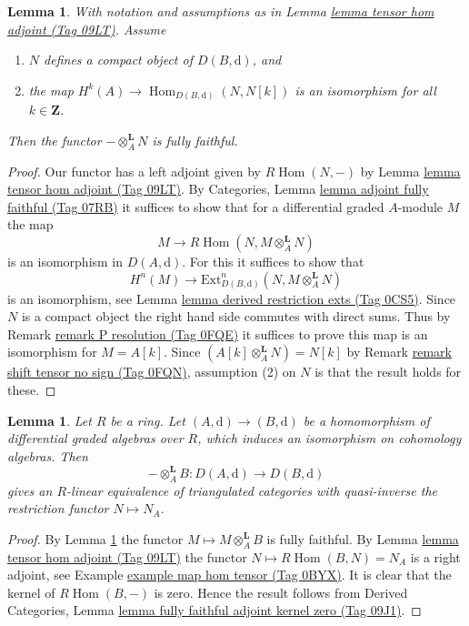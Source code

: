 \documentclass{amsart}
\theoremstyle{plain}
\newtheorem{lemma}[subsection]{Lemma}
\theoremstyle{definition}
\theoremstyle{remark}
\numberwithin{equation}{subsection}
\def\Hom{\mathop{\mathrm{Hom}}\nolimits}
\begin{document}
\begin{lemma}
\label{lemma-tensor-with-compact-fully-faithful}
With notation and assumptions as in Lemma \href{https://stacks.math.columbia.edu/tag/09LT}{lemma tensor hom adjoint (Tag 09LT)}.
Assume
\begin{enumerate}
\item $N$ defines a compact object of $D(B, \text{d})$, and
\item the map $H^k(A) \to \Hom_{D(B, \text{d})}(N, N[k])$ is an
isomorphism for all $k \in \mathbf{Z}$.
\end{enumerate}
Then the functor $-\otimes_A^\mathbf{L} N$ is fully faithful.
\end{lemma}

\begin{proof}
Our functor has a left adjoint given by
$R\Hom(N, -)$ by Lemma \href{https://stacks.math.columbia.edu/tag/09LT}{lemma tensor hom adjoint (Tag 09LT)}.
By Categories, Lemma \href{https://stacks.math.columbia.edu/tag/07RB}{lemma adjoint fully faithful (Tag 07RB)}
it suffices to show that for a differential graded $A$-module $M$
the map
$$
M \longrightarrow R\Hom(N, M \otimes_A^\mathbf{L} N)
$$
is an isomorphism in $D(A, \text{d})$. For this it suffices to show that
$$
H^n(M) \longrightarrow
\text{Ext}^n_{D(B, \text{d})}(N, M \otimes_A^\mathbf{L} N)
$$
is an isomorphism, see Lemma \href{https://stacks.math.columbia.edu/tag/0CS5}{lemma derived restriction exts (Tag 0CS5)}.
Since $N$ is a compact object the right hand side commutes
with direct sums. Thus by Remark \href{https://stacks.math.columbia.edu/tag/0FQE}{remark P resolution (Tag 0FQE)}
it suffices to prove this map is an isomorphism for $M = A[k]$.
Since $(A[k] \otimes_A^\mathbf{L} N) = N[k]$ by
Remark \href{https://stacks.math.columbia.edu/tag/0FQN}{remark shift tensor no sign (Tag 0FQN)},
assumption (2) on $N$ is that the result holds for these.
\end{proof}


\begin{lemma}
\label{lemma-qis-equivalence}
Let $R$ be a ring. Let $(A, \text{d}) \to (B, \text{d})$ be a
homomorphism of differential graded algebras over $R$, which induces
an isomorphism on cohomology algebras. Then
$$
- \otimes_A^\mathbf{L} B : D(A, \text{d}) \to D(B, \text{d})
$$
gives an $R$-linear equivalence of triangulated categories with
quasi-inverse the restriction functor $N \mapsto N_A$.
\end{lemma}

\begin{proof}
By Lemma \ref{lemma-tensor-with-compact-fully-faithful}
the functor $M \longmapsto M \otimes_A^\mathbf{L} B$ is
fully faithful. By Lemma \href{https://stacks.math.columbia.edu/tag/09LT}{lemma tensor hom adjoint (Tag 09LT)}
the functor $N \longmapsto R\Hom(B, N) = N_A$ is a right adjoint, see
Example \href{https://stacks.math.columbia.edu/tag/0BYX}{example map hom tensor (Tag 0BYX)}.
It is clear that the kernel of $R\Hom(B, -)$ is zero.
Hence the result follows from
Derived Categories, Lemma
\href{https://stacks.math.columbia.edu/tag/09J1}{lemma fully faithful adjoint kernel zero (Tag 09J1)}.
\end{proof}
\end{document}
